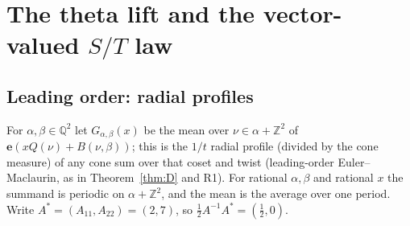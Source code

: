 \documentclass[11pt]{article}
\theoremstyle{definition}
\newcommand{\Q}{\mathbb{Q}}
\newcommand{\Z}{\mathbb{Z}}
\newcommand{\e}{\mathbf{e}}
\begin{document}
\section{The theta lift and the vector-valued $S/T$ law}\label{sec:lift}

\subsection{Leading order: radial profiles}\label{sec:lead}
For $\alpha,\beta\in\Q^2$ let $G_{\alpha,\beta}(x)$ be the mean over $\nu\in\alpha+\Z^2$ of $\e(xQ(\nu)+B(\nu,\beta))$; this is the $1/t$
radial profile (divided by the cone measure) of any cone sum over that coset and twist (leading-order Euler--Maclaurin, as in
Theorem~\ref{thm:D} and R1). For rational $\alpha,\beta$ and rational $x$ the summand is periodic on $\alpha+\Z^2$, and the mean is the average over
one period. Write $A^*=(A_{11},A_{22})=(2,7)$, so $\tfrac12A^{-1}A^*=(\tfrac12,0)$.
\end{document}
